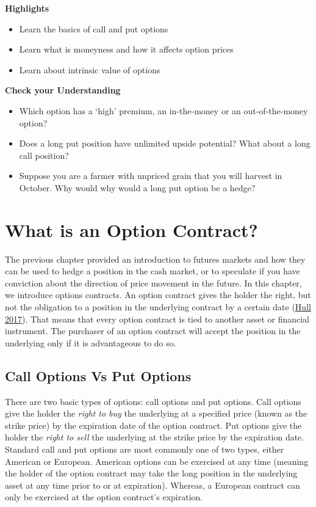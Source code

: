 \documentclass[
]{book}
\begin{document}
\textbf{Highlights}

\begin{itemize}
\item
  Learn the basics of call and put options
\item
  Learn what is moneyness and how it affects option prices
\item
  Learn about intrinsic value of options
\end{itemize}

\textbf{Check your Understanding}

\begin{itemize}
\item
  Which option has a `high' premium, an in-the-money or an out-of-the-money option?
\item
  Does a long put position have unlimited upside potential? What about a long call position?
\item
  Suppose you are a farmer with unpriced grain that you will harvest in October. Why would why would a long put option be a hedge?
\end{itemize}

\hypertarget{what-is-an-option-contract}{%
\section{What is an Option Contract?}\label{what-is-an-option-contract}}

The previous chapter provided an introduction to futures markets and how they can be used to hedge a position in the cash market, or to speculate if you have conviction about the direction of price movement in the future. In this chapter, we introduce options contracts. An option contract gives the holder the right, but not the obligation to a position in the underlying contract by a certain date (\protect\hyperlink{ref-hull2017fundamentals}{Hull 2017}). That means that every option contract is tied to another asset or financial instrument. The purchaser of an option contract will accept the position in the underlying only if it is advantageous to do so.

\hypertarget{call-options-vs-put-options}{%
\subsection{Call Options Vs Put Options}\label{call-options-vs-put-options}}

There are two basic types of options: call options and put options. Call options give the holder the \emph{right to buy} the underlying at a specified price (known as the strike price) by the expiration date of the option contract. Put options give the holder the \emph{right to sell} the underlying at the strike price by the expiration date. Standard call and put options are most commonly one of two types, either American or European. American options can be exercised at any time (meaning the holder of the option contract may take the long position in the underlying asset at any time prior to or at expiration). Whereas, a European contract can only be exercised at the option contract's expiration.
\end{document}
